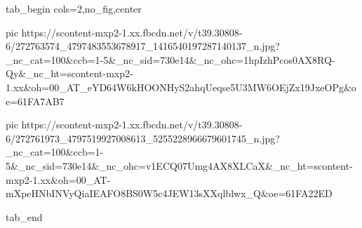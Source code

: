  
 
 
 
 


\ifcmt
  tab_begin cols=2,no_fig,center

     pic https://scontent-mxp2-1.xx.fbcdn.net/v/t39.30808-6/272763574_4797483553678917_1416540197287140137_n.jpg?_nc_cat=100&ccb=1-5&_nc_sid=730e14&_nc_ohc=1hpIzhPcos0AX8RQ-Qy&_nc_ht=scontent-mxp2-1.xx&oh=00_AT_eYD64W6kHOONHyS2ahqUeqse5U3MW6OEjZx19JxeOPg&oe=61FA7AB7

     pic https://scontent-mxp2-1.xx.fbcdn.net/v/t39.30808-6/272761973_4797519927008613_5255228966679601745_n.jpg?_nc_cat=100&ccb=1-5&_nc_sid=730e14&_nc_ohc=v1ECQ07Umg4AX8XLCaX&_nc_ht=scontent-mxp2-1.xx&oh=00_AT-mXpeHNbINVyQiaIEAFO8BS0W5c4JEW13sXXqlblwx_Q&oe=61FA22ED

  tab_end
\fi
